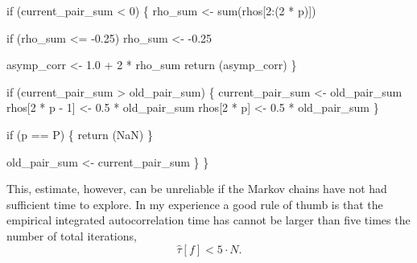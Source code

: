 \documentclass[
  letterpaper,
  DIV=11,
  numbers=noendperiod]{scrartcl}
\newenvironment{Shaded}{\begin{snugshade}}{\end{snugshade}}
\newcommand{\BuiltInTok}[1]{\textcolor[rgb]{0.00,0.23,0.31}{#1}}
\newcommand{\ControlFlowTok}[1]{\textcolor[rgb]{0.00,0.23,0.31}{#1}}
\newcommand{\DecValTok}[1]{\textcolor[rgb]{0.68,0.00,0.00}{#1}}
\newcommand{\FloatTok}[1]{\textcolor[rgb]{0.68,0.00,0.00}{#1}}
\newcommand{\NormalTok}[1]{\textcolor[rgb]{0.00,0.23,0.31}{#1}}
\newcommand{\OperatorTok}[1]{\textcolor[rgb]{0.37,0.37,0.37}{#1}}
\begin{document}
\begin{Shaded}
\begin{Highlighting}[]
    \ControlFlowTok{if}\NormalTok{ (current\_pair\_sum }\OperatorTok{\textless{}} \DecValTok{0}\NormalTok{) \{}
\NormalTok{      rho\_sum }\OperatorTok{\textless{}{-}} \BuiltInTok{sum}\NormalTok{(rhos[}\DecValTok{2}\NormalTok{:(}\DecValTok{2} \OperatorTok{*}\NormalTok{ p)])}
    
      \ControlFlowTok{if}\NormalTok{ (rho\_sum }\OperatorTok{\textless{}=} \OperatorTok{{-}}\FloatTok{0.25}\NormalTok{)}
\NormalTok{        rho\_sum }\OperatorTok{\textless{}{-}} \OperatorTok{{-}}\FloatTok{0.25}
    
\NormalTok{      asymp\_corr }\OperatorTok{\textless{}{-}} \FloatTok{1.0} \OperatorTok{+} \DecValTok{2} \OperatorTok{*}\NormalTok{ rho\_sum}
      \ControlFlowTok{return}\NormalTok{ (asymp\_corr)}
\NormalTok{    \}}
  
    \ControlFlowTok{if}\NormalTok{ (current\_pair\_sum }\OperatorTok{\textgreater{}}\NormalTok{ old\_pair\_sum) \{}
\NormalTok{      current\_pair\_sum }\OperatorTok{\textless{}{-}}\NormalTok{ old\_pair\_sum}
\NormalTok{      rhos[}\DecValTok{2} \OperatorTok{*}\NormalTok{ p }\OperatorTok{{-}} \DecValTok{1}\NormalTok{] }\OperatorTok{\textless{}{-}} \FloatTok{0.5} \OperatorTok{*}\NormalTok{ old\_pair\_sum}
\NormalTok{      rhos[}\DecValTok{2} \OperatorTok{*}\NormalTok{ p] }\OperatorTok{\textless{}{-}} \FloatTok{0.5} \OperatorTok{*}\NormalTok{ old\_pair\_sum}
\NormalTok{    \}}
  
    \ControlFlowTok{if}\NormalTok{ (p }\OperatorTok{==}\NormalTok{ P) \{}
      \ControlFlowTok{return}\NormalTok{ (NaN)}
\NormalTok{    \}}
  
\NormalTok{    old\_pair\_sum }\OperatorTok{\textless{}{-}}\NormalTok{ current\_pair\_sum}
\NormalTok{  \}}
\NormalTok{\}}
\end{Highlighting}
\end{Shaded}

This, estimate, however, can be unreliable if the Markov chains have not
had sufficient time to explore. In my experience a good rule of thumb is
that the empirical integrated autocorrelation time has cannot be larger
than five times the number of total iterations, \[
\hat{\tau}[f] < 5 \cdot N.
\]
\end{document}
